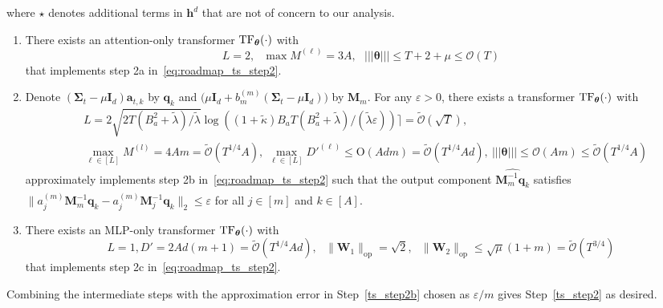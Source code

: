 \documentclass[10pt]{article}
\newcommand{\id}{\bI}
\newcommand{\eps}{\varepsilon}
\newcommand{\lops}[1]{\|{#1}\|_{\mathrm{op}}}
\renewcommand{\cO}{\mathcal{O}}
\newcommand{\<}{\left\langle}
\renewcommand{\>}{\right\rangle}
\newcommand{\lth}{{(\ell)}}
\newcommand{\TF}{{\rm TF}}
\newcommand{\nrmp}[1]{{\left|\!\left|\!\left|{#1}\right|\!\right|\!\right|}}
\newcommand{\partd}{{d}}
\newcommand{\Tpscov}{{{\mathbf\Sigma}}}
\newcommand{\prodeig}{{\mu}}
\newcommand{\padecond}{{\tilde \kappa}}
\newcommand{\intvec}{{\mathbf {q}}}
\newcommand{\intmat}{{\mathbf {M}}}
\newcommand{\tcO}{{\tilde{\mathcal O}}}
\newcommand{\hidden}{{D'}}
\newcommand{\conO}{{\mathrm{O}}}
\def\bI{{\mathbf I}}
\def\bW{{\mathbf W}}
\def\btheta{{\boldsymbol \theta}}
\def\ba{{\mathbf a}}
\def\bh{{\mathbf h}}
\begin{document}
where $\star$ denotes additional terms in $\bh^\partd$ that are not of concern to our analysis.
\begin{enumerate}[label=Step 2\alph*,ref= 2\alph*]
        \item\label{ts_step2a}  There exists an attention-only transformer $\TF_\btheta(\cdot)$ with     $$L=2,~~~\max M^{\lth}=3A,~~~ \nrmp{\btheta}\leq T+2+{\prodeig}\leq\cO(T) $$
 that implements step 2a in~\eqref{eq:roadmap_ts_step2}.
     \item\label{ts_step2b} Denote ${(\Tpscov_t-\prodeig\id_d)\ba_{t,k}}$ by  $\intvec_{k}$ and $\Big({\prodeig}\id_d+{b_m^{(m)}(\Tpscov_t-\prodeig \id_d)}\Big)$ by $\intmat_m$. For any $\eps>0$,   there exists a  transformer $\TF_\btheta(\cdot)$ with
     \begin{align*}
     &L=2\sqrt{2 T(B_a^2+\tilde\lambda)/\tilde\lambda}\log((1+\padecond)B_aT(B_a^2+\tilde\lambda)/(\tilde\lambda\eps))\rceil=\tcO(\sqrt{T}),\\  &
     \max_{\ell\in[L]}M^{(l)}=4Am=\tcO(T^{1/4}A),~\max_{\ell\in[L]}\hidden^\lth\leq \conO(Adm)=\tcO(T^{1/4}Ad),~ \nrmp{\btheta}\leq  \cO(Am)\leq  \tcO(T^{1/4}A)
     \end{align*}
     approximately implements step 2b in~\eqref{eq:roadmap_ts_step2} such that the output component $\widehat{\intmat_m^{-1}\intvec_k}$ satisfies $\|\widehat{a_j^{(m)}\intmat_m^{-1}\intvec_k}-{a_j^{(m)}\intmat_j^{-1}\intvec_k}\|_2\leq\eps$ for all $j\in[m]$ and $k\in[A]$.
 \item\label{ts_step2c}  There exists an MLP-only transformer $\TF_\btheta(\cdot)$ with     $$L=1,D'=2Ad(m+1)=\tcO(T^{1/4}Ad),~~~\lops{\bW_1}=\sqrt{2}, ~~~\lops{\bW_2}\leq \sqrt{\prodeig}(1+m)=\tcO(T^{3/4})$$  that implements step 2c in~\eqref{eq:roadmap_ts_step2}.
\end{enumerate}
Combining the intermediate steps with the approximation error in Step~\ref{ts_step2b} chosen as $\eps/m$  gives Step~\ref{ts_step2} as desired.
\end{document}
